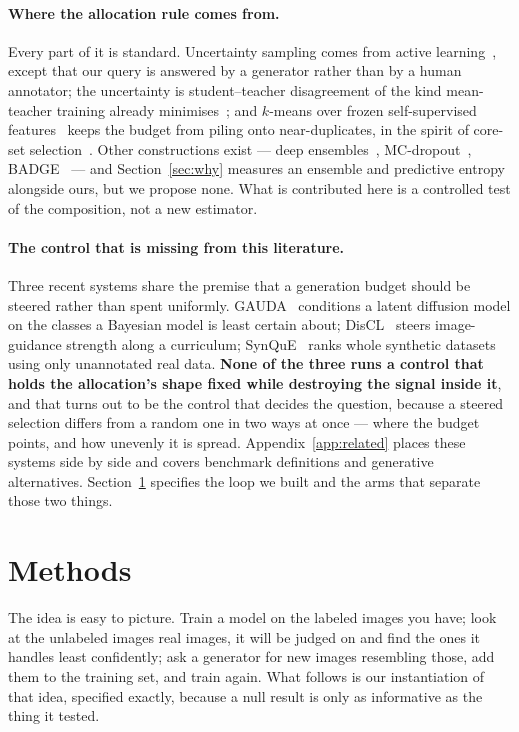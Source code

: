 \documentclass{article}
\begin{document}
\paragraph{Where the allocation rule comes from.} Every part of it is standard. Uncertainty sampling
comes from active learning~\citep{settles2009active}, except that our query is answered by a
generator rather than by a human annotator; the uncertainty is student--teacher disagreement of the
kind mean-teacher training already minimises~\citep{tarvainen2017mean}; and $k$-means over frozen
self-supervised features~\citep{oquab2024dinov2,radford2021learning} keeps the budget from piling
onto near-duplicates, in the spirit of core-set selection~\citep{sener2018active}. Other
constructions exist --- deep ensembles~\citep{lakshminarayanan2017simple},
MC-dropout~\citep{gal2016dropout}, BADGE~\citep{ash2020deep} --- and Section~\ref{sec:why} measures
an ensemble and predictive entropy alongside ours, but we propose none. What is contributed here is a controlled test of the composition, not a new estimator.

\paragraph{The control that is missing from this literature.} Three recent systems share the premise
that a generation budget should be steered rather than spent uniformly.
GAUDA~\citep{frisch2025gauda} conditions a latent diffusion model on the classes a Bayesian model is
least certain about; DisCL~\citep{liang2025discl} steers image-guidance strength along a curriculum;
SynQuE~\citep{chen2025synque} ranks whole synthetic datasets using only unannotated real data.
\textbf{None of the three runs a control that holds the allocation's shape fixed while destroying
the signal inside it}, and that turns out to be the control that decides the question, because a
steered selection differs from a random one in two ways at once --- where the budget points, and how
unevenly it is spread. Appendix~\ref{app:related} places these systems side by side and covers
benchmark definitions and generative alternatives. Section~\ref{sec:method} specifies the loop we
built and the arms that separate those two things.

\section{Methods}
\label{sec:method}
The idea is easy to picture. Train a model on the labeled images you have; look at the unlabeled images
real images, it will be judged on and find the ones it handles least confidently; ask a generator for
new images resembling those, add them to the training set, and train again. What follows is our
instantiation of that idea, specified exactly, because a null result is only as informative as the
thing it tested.
\end{document}
